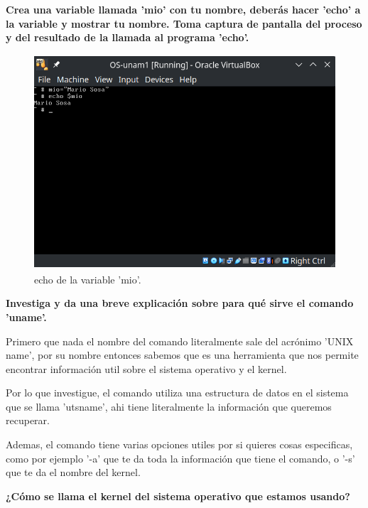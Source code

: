 \item \textbf{Crea una variable llamada 'mio' con tu nombre, deberás hacer 'echo' a la variable y mostrar tu nombre. Toma captura de pantalla del proceso y del resultado de la llamada al programa 'echo'.}  \vspace{0.3cm}

\begin{figure}[H]
    \centering
    \includegraphics[height=8cm]{src/Img/1.png}
    \caption{echo de la variable 'mio'.}
    \label{fig:echoMio}
\end{figure}


\item \textbf{Investiga y da una breve explicación sobre para qué sirve el comando 'uname'.}  \vspace{0.3cm}

Primero que nada el nombre del comando literalmente sale del acrónimo 'UNIX name', por su nombre entonces sabemos que es una herramienta que nos permite encontrar información util sobre el sistema operativo y el kernel. \vspace{.2cm}

Por lo que investigue, el comando utiliza una estructura de datos en el sistema que se llama 'utsname', ahi tiene literalmente la información que queremos recuperar. \vspace{.2cm}

Ademas, el comando tiene varias opciones utiles por si quieres cosas especificas, como por ejemplo '-a' que te da toda la información que tiene el comando, o '-s' que te da el nombre del kernel. \vspace{.2cm} \cite{gnu_uname}

\item \textbf{¿Cómo se llama el kernel del sistema operativo que estamos usando?}  \vspace{0.3cm}

